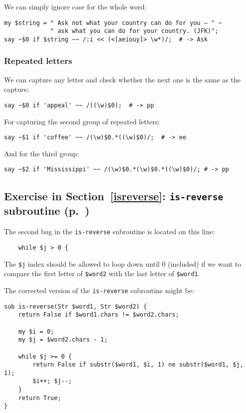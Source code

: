 We can simply ignore case for the whole word:
\begin{verbatim}
my $string = " Ask not what your country can do for you — " ~
             " ask what you can do for your country. (JFK)";
say ~$0 if $string ~~ /:i << (<[aeiouy]> \w*)/;  # -> Ask
\end{verbatim}

\subsubsection{Repeated letters}

We can capture any letter and check whether the next one is 
the same as the capture:

\begin{verbatim}
say ~$0 if 'appeal' ~~ /((\w)$0);  # -> pp
\end{verbatim}

For capturing the second group of repeated letters:

\begin{verbatim}
say ~$1 if 'coffee' ~~ /(\w)$0.*((\w)$0)/;  # -> ee
\end{verbatim}

And for the third group:

\begin{verbatim}
say ~$2 if 'Mississippi' ~~ /(\w)$0.*(\w)$0.*((\w)$0)/; # -> pp
\end{verbatim}


\subsection{Exercise in Section~\ref{isreverse}: {\tt is-reverse} subroutine (p.~\pageref{isreverse})}
\label{sol_isreverse}

The second bug in the {\tt is-reverse} subroutine is located 
on this line:

\begin{verbatim}
    while $j > 0 {
\end{verbatim}
%

The {\tt \$j} index should be allowed to loop down until 0 
(included) if we want to compare the first letter of 
{\tt \$word2} with the last letter of {\tt \$word1}.

The corrected version of the  {\tt is-reverse} subroutine 
might be:

\begin{verbatim}
sub is-reverse(Str $word1, Str $word2) {
    return False if $word1.chars != $word2.chars;
    
    my $i = 0;
    my $j = $word2.chars - 1;

    while $j >= 0 {
        return False if substr($word1, $i, 1) ne substr($word1, $j, 1);
        $i++; $j--;
    }
    return True;
}
\end{verbatim}
%

